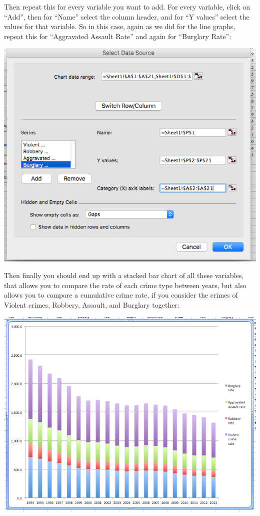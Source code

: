 \documentclass[
]{book}
\begin{document}
Then repeat this for every variable you want to add. For every variable, click on ``Add'', then for ``Name'' select the column header, and for ``Y values'' select the values for that variable. So in this case, again as we did for the line graphs, repeat this for ``Aggravated Assault Rate'' and again for ``Burglary Rate'':

\includegraphics{imgs/comp_c_5.png}

Then finally you should end up with a stacked bar chart of all these variables, that allows you to compare the rate of each crime type between years, but also allows you to compare a cumulative crime rate, if you consider the crimes of Violent crimes, Robbery, Assault, and Burglary together:

\includegraphics{imgs/stackedbar_final.png}
\end{document}
